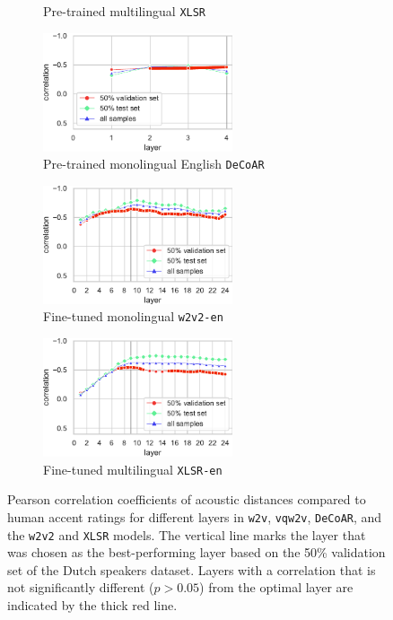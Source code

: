 \documentclass[11pt,a4paper]{article}
\begin{document}
\begin{figure}[ht]
\begin{subfigure}[b]{0.49\textwidth}
         \caption{Pre-trained multilingual \texttt{XLSR}}
         \label{fig:curveXLSRDSD}
     \end{subfigure}
     \par\smallskip
     \begin{subfigure}[b]{0.49\textwidth}
         \centering
         \includegraphics[width=2.2in]{figures/DSD/decoar.pdf}
         \caption{Pre-trained monolingual English \texttt{DeCoAR}}
         \label{fig:curveDECOARDSD}
     \end{subfigure}
     \begin{subfigure}[b]{0.49\textwidth}
         \centering
         \includegraphics[width=2.2in]{figures/DSD/wav2vec2-large-960h.pdf}
         \caption{Fine-tuned monolingual \texttt{w2v2-en}}
         \label{fig:curveW2V2-ENDSD}
      \end{subfigure}
      \par\smallskip
      \begin{subfigure}[b]{0.49\textwidth}
         \centering
         \includegraphics[width=2.2in]{figures/DSD/wav2vec2-large-xlsr-53-english.pdf}
         \caption{Fine-tuned multilingual \texttt{XLSR-en}}
         \label{fig:curveXLSR-ENDSD}
     \end{subfigure}
     \caption{Pearson correlation coefficients of acoustic distances compared to human accent ratings for different layers in \texttt{w2v}, \texttt{vqw2v}, \texttt{DeCoAR}, and the \texttt{w2v2} and \texttt{XLSR} models. The vertical line marks the layer that was chosen as the best-performing layer based on the 50\% validation set of the Dutch speakers dataset. Layers with a correlation that is  not significantly different ($p > 0.05$) from the optimal layer are indicated by the thick red line.}
     \label{fig:curveDSD}
\end{figure}
\end{document}
